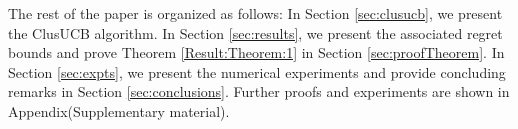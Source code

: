 The rest of the paper is organized as follows: In Section \ref{sec:clusucb}, we present the ClusUCB algorithm. In Section \ref{sec:results}, we present the associated regret bounds and prove Theorem \ref{Result:Theorem:1} in Section \ref{sec:proofTheorem}. In Section \ref{sec:expts}, we present the numerical experiments and provide concluding remarks in Section \ref{sec:conclusions}. Further proofs and experiments are shown in Appendix(Supplementary material).
